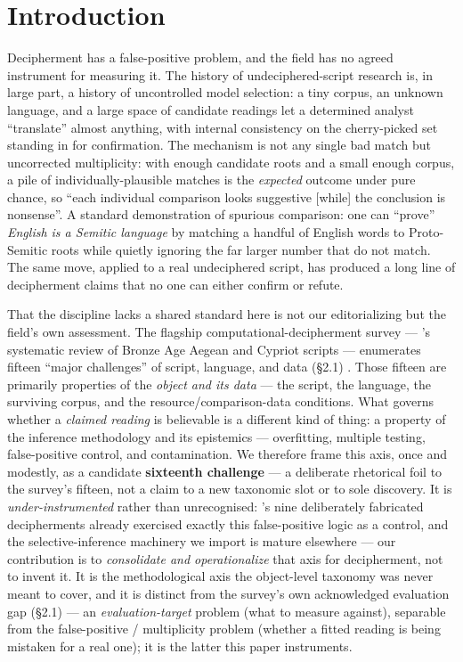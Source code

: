 \section{Introduction}

Decipherment has a false-positive problem, and the field has no agreed
instrument for measuring it. The history of undeciphered-script research
is, in large part, a history of uncontrolled model selection: a tiny
corpus, an unknown language, and a large space of candidate readings let
a determined analyst ``translate'' almost anything, with internal
consistency on the cherry-picked set standing in for confirmation. The
mechanism is not any single bad match but uncorrected multiplicity: with
enough candidate roots and a small enough corpus, a pile of
individually-plausible matches is the \emph{expected} outcome under pure
chance, so ``each individual comparison looks suggestive [while] the
conclusion is nonsense''. A standard demonstration of spurious
comparison: one can ``prove'' \emph{English is a Semitic language} by
matching a handful of English words to Proto-Semitic roots while quietly
ignoring the far larger number that do not match. The same move, applied
to a real undeciphered script, has produced a long line of decipherment
claims that no one can either confirm or refute.

That the discipline lacks a shared standard here is not our editorializing
but the field's own assessment. The flagship computational-decipherment
survey --- \citeauthor{braovic2024}'s \citeyearpar{braovic2024}
systematic review of Bronze Age Aegean and Cypriot scripts ---
enumerates fifteen ``major challenges'' of script, language, and data
(\S2.1) \citep{braovic2024}. Those fifteen are
primarily properties of the \emph{object and its data} --- the script,
the language, the surviving corpus, and the resource/comparison-data
conditions. What
governs whether a \emph{claimed reading} is believable is a different
kind of thing: a property of the inference methodology and its
epistemics --- overfitting, multiple testing, false-positive control,
and contamination. We therefore frame this axis, once and modestly, as a
candidate \textbf{sixteenth challenge} --- a deliberate rhetorical foil
to the survey's fifteen, not a claim to a new taxonomic slot or to sole
discovery. It is \emph{under-instrumented} rather than unrecognised:
\citeauthor{packard1974}'s \citeyearpar{packard1974} nine deliberately
fabricated decipherments already exercised exactly this false-positive
logic as a control, and the selective-inference machinery we import
\citep{bailey2014} is mature elsewhere --- our contribution is to
\emph{consolidate and operationalize} that axis for decipherment, not to
invent it. It is the methodological axis the object-level taxonomy was
never meant to cover, and it is distinct from the survey's own
acknowledged evaluation gap (\S2.1) --- an \emph{evaluation-target}
problem (what to measure against), separable from the false-positive /
multiplicity problem (whether a fitted reading is being mistaken for a
real one); it is the latter this paper instruments.

